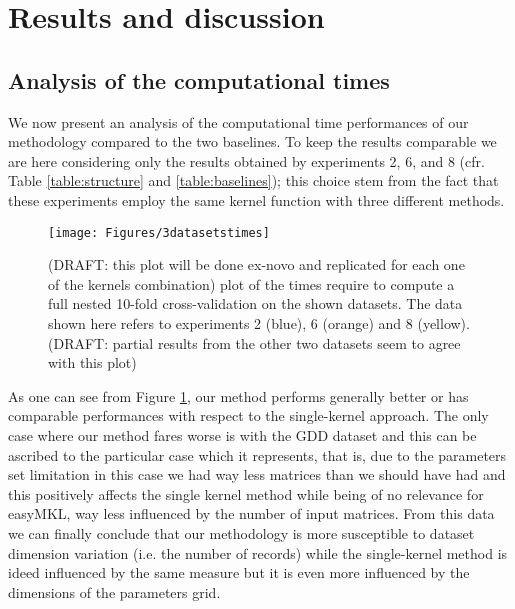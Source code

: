 
\section{Results and discussion}
\label{sec:results}

\subsection{Analysis of the computational times}
\label{subsec:time_results}

We now present an analysis of the computational time performances of our methodology
compared to the two baselines. To keep the results comparable we are here considering
only the results obtained by experiments 2, 6, and 8 (cfr. Table \ref{table:structure} and \ref{table:baselines});
this choice stem from the fact
that these experiments employ the same kernel function with three different methods.

\begin{figure}[ht]
    \centering
    \texttt{[image: Figures/3datasetstimes]}
    \caption{(DRAFT: this plot will be done ex-novo and replicated for each one of the kernels combination)
        plot of the times require to compute a full nested
        10-fold cross-validation on the shown datasets.
        The data shown here refers to experiments 2 (blue), 6 (orange) and 8 (yellow).
        (DRAFT: partial results from the other two datasets seem to agree with this plot)
    }
        \label{fig:datasetstimes}
\end{figure}

As one can see from Figure \ref{fig:datasetstimes}, our method performs generally
better or has comparable performances with respect to the single-kernel approach.
The only case where our method fares worse is with the GDD dataset and this can be
ascribed to the particular case which it represents, that is, due to the parameters
set limitation in this case we had way less matrices than we should have had and
this positively affects the single kernel method while being of no relevance for
easyMKL, way less influenced by the number of input matrices.
From this data we can finally conclude that our methodology is more susceptible
to dataset dimension variation (i.e. the number of records) while the single-kernel
method is ideed influenced by the same measure but it is even more influenced by
the dimensions of the parameters grid.

